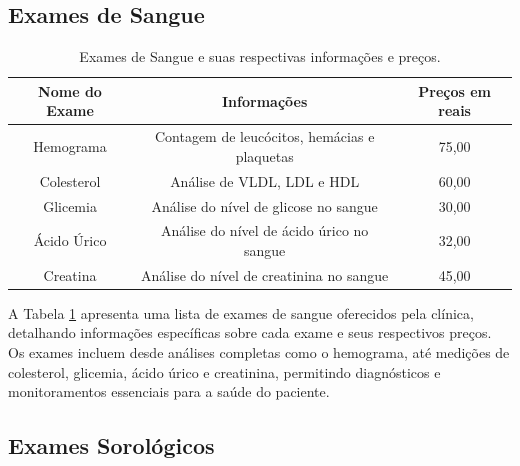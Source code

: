 \documentclass{article}
\begin{document}
    \subsection{Exames de Sangue}
        \begin{table}[H]
            \centering
            \caption{Exames de Sangue e suas respectivas informações e preços.}
            \label{tab:exames de sangue}
            \begin{tabular}{|c|c|c|}
            \hline
            Nome do Exame & Informações & Preços em reais \\
            \hline
            Hemograma & Contagem de leucócitos, hemácias e plaquetas & 75,00\\
            \hline
            Colesterol & Análise de VLDL, LDL e HDL & 60,00 \\
            \hline
            Glicemia & Análise do nível de glicose no sangue & 30,00 \\
            \hline              
            Ácido Úrico & Análise do nível de ácido úrico no sangue & 32,00 \\
            \hline
            Creatina & Análise do nível de creatinina no sangue & 45,00 \\
            \hline
            \end{tabular}
        \end{table}

        A Tabela \ref{tab:exames de sangue} apresenta uma lista de exames de sangue oferecidos pela clínica, detalhando informações específicas sobre cada exame e seus respectivos preços. Os exames incluem desde análises completas como o hemograma, até medições de colesterol, glicemia, ácido úrico e creatinina, permitindo diagnósticos e monitoramentos essenciais para a saúde do paciente.
    
    \subsection{Exames Sorológicos}
\end{document}

